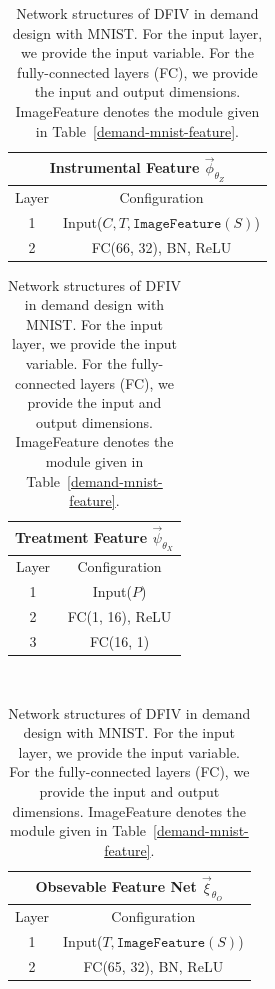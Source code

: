 \begingroup
\renewcommand{\arraystretch}{1.2}
\begin{table}[t]
    \caption{Network structures of DFIV in demand design with MNIST. For the input layer, we provide the input variable. For the fully-connected layers (FC), we provide the input and output dimensions.  ImageFeature denotes the module given in Table~\ref{demand-mnist-feature}.}
    
    \label{dfiv-demand-network-mnist}
    
    \begin{minipage}{0.48\hsize}
        \centering
        \begin{tabular}{cc}
            \multicolumn{2}{c}{\textbf{Instrumental Feature} $\vec{\phi}_{\theta_Z}$ }
            \\ \hline
            Layer & Configuration \\ \hline
            1 & Input($C, T, \mathtt{ImageFeature}(S)$) \\ \hline
            2 & FC(66, 32), BN, ReLU\\ \hline
            \end{tabular}    
    \end{minipage}
    \hfill
    \begin{minipage}{0.48\hsize}
        \centering
        \begin{tabular}{cc}
            \multicolumn{2}{c}{\textbf{Treatment Feature} $\vec{\psi}_{\theta_X}$} 
            \\ \hline
            Layer & Configuration \\ \hline
            1 & Input($P$) \\ \hline
            2 & FC(1, 16), ReLU \\ \hline
            3 & FC(16, 1) \\ \hline
            \end{tabular}    
    \end{minipage}\\
    \centering
    
    \begin{minipage}{0.48\hsize}
        \centering
        \begin{tabular}{cc}
            \multicolumn{2}{c}{\textbf{Obsevable Feature Net} $\vec{\xi}_{\theta_O}$} 
            \\ \hline
            Layer & Configuration \\ \hline
            1 & Input($T, \mathtt{ImageFeature}(S)$) \\ \hline
            2 & FC(65, 32), BN, ReLU \\ \hline
            \end{tabular}    
    \end{minipage}
\end{table}
\endgroup  

